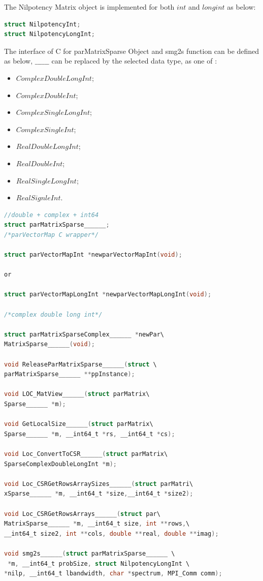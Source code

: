 \documentclass[a4paper, 10 pt]{report}
\begin{document}
	The  Nilpotency Matrix object is implemented for both $int$ and $long int$ as below:
		\begin{lstlisting}[language=C,frame=single,	basicstyle=\footnotesize]
struct NilpotencyInt;
struct NilpotencyLongInt;
		\end{lstlisting}
	
	The interface of C for parMatrixSparse Object and smg2s function can be defined as below, $\_\_\_\_\_\_$ can be replaced by the selected data type, as one of :
	
	\begin{multicols}{2}
	\begin{itemize}
		\item $ComplexDoubleLongInt$;
		\item $ComplexDoubleInt$;
		\item $ComplexSingleLongInt$;
		\item $ComplexSingleInt$;
		\item $RealDoubleLongInt$;
		\item $RealDoubleInt$;
		\item $RealSingleLongInt$;
		\item $RealSignleInt$.
	\end{itemize}
	\end{multicols}

	\begin{lstlisting}[language=C,frame=single,	basicstyle=\footnotesize]
//double + complex + int64
struct parMatrixSparse______;   
/*parVectorMap C wrapper*/

struct parVectorMapInt *newparVectorMapInt(void);

or 

struct parVectorMapLongInt *newparVectorMapLongInt(void);

/*complex double long int*/
   
struct parMatrixSparseComplex______ *newPar\
MatrixSparse______(void);

void ReleaseParMatrixSparse______(struct \
parMatrixSparse______ **ppInstance);

void LOC_MatView______(struct parMatrix\
Sparse______ *m);

void GetLocalSize______(struct parMatrix\
Sparse______ *m, __int64_t *rs, __int64_t *cs);

void Loc_ConvertToCSR______(struct parMatrix\
SparseComplexDoubleLongInt *m);
   
void Loc_CSRGetRowsArraySizes______(struct parMatri\
xSparse______ *m, __int64_t *size,__int64_t *size2);

void Loc_CSRGetRowsArrays______(struct par\
MatrixSparse______ *m, __int64_t size, int **rows,\
__int64_t size2, int **cols, double **real, double **imag);

void smg2s______(struct parMatrixSparse______ \
 *m, __int64_t probSize, struct NilpotencyLongInt \
*nilp, __int64_t lbandwidth, char *spectrum, MPI_Comm comm);
   
	\end{lstlisting}
\end{document}
